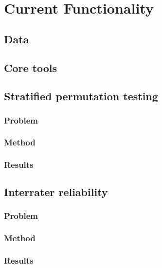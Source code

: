 \chapter{Current Functionality}

\section{Data}

\section{Core tools}

\section{Stratified permutation testing}

\subsection{Problem}


\subsection{Method}

\subsection{Results}

\section{Interrater reliability}

\subsection{Problem}

\cite{davies1982measuring}

\subsection{Method}

\subsection{Results}
